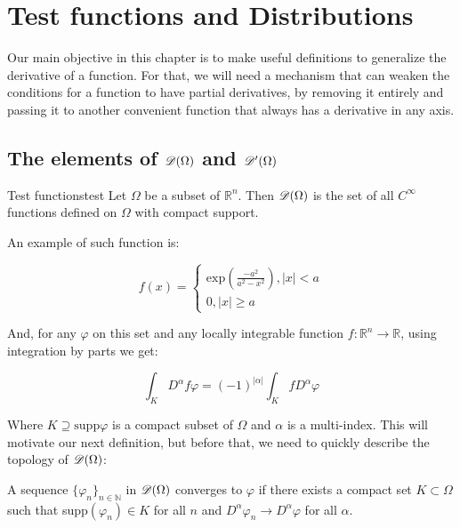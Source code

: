 \chapter{Test functions and Distributions}

Our main objective in this chapter is to make useful definitions to generalize the derivative of a function. For that, we will need a mechanism that can weaken the conditions for a function to have partial derivatives, by removing it entirely and passing it to another convenient function that always has a derivative in any axis. 


\section{The elements of $\mathscr{D}(\Omega)$ and $\mathscr{D}'(\Omega)$}

\begin{definition}{Test functions}{test}
    Let $\Omega$ be a subset of $\mathbb{R}^n$. Then $\mathscr{D}(\Omega)$ is the set of all $C^\infty$ functions defined on $\Omega$ with compact support. 
\end{definition}

An example of such function is:

\[
    f(x) =
    \begin{cases}
    \text{exp}(\frac{-a^2}{a^2 - x^2}),\left\lvert x\right\rvert < a\\
    0, \left\lvert x\right\rvert\geq a
    \end{cases}
\]

And, for any $\varphi$ on this set and any locally integrable function $f:\mathbb{R}^n\rightarrow\mathbb{R}$, using integration by parts we get:

\begin{equation}
    \int_{K}D^\alpha f\varphi = (-1)^{\left\lvert\alpha\right\rvert}\int_{K}fD^\alpha\varphi
\end{equation}

Where $K\supseteq\text{supp}\varphi$ is a compact subset of $\Omega$ and $\alpha$ is a multi-index. This will motivate our next definition, but before that, we need to quickly describe the topology of $\mathscr{D}(\Omega)$:

\begin{tcolorbox}[colback=gray!5,colframe=gray!80!black]
    A sequence $\{\varphi_n\}_{n\in\mathbb{N}}$ in $\mathscr{D}(\Omega)$ converges to $\varphi$ if there exists a compact set $K\subset\Omega$ such that supp$(\varphi_n)\in K$ for all $n$ and $D^\alpha\varphi_n\rightarrow D^\alpha\varphi$ for all $\alpha$. 
\end{tcolorbox}

